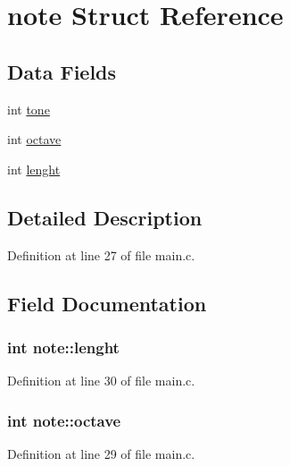 \hypertarget{structnote}{\section{note Struct Reference}
\label{structnote}
}
\subsection*{Data Fields}
\begin{DoxyCompactItemize}
\item 
int \hyperlink{structnote_a30832d96c968d682e5838b39370a1908}{tone}
\item 
int \hyperlink{structnote_a8b58f133e02c3ea4ec40ee641b654dcf}{octave}
\item 
int \hyperlink{structnote_a361dd34c08a22e0d8af45bfb8fefb287}{lenght}
\end{DoxyCompactItemize}


\subsection{Detailed Description}


Definition at line 27 of file main.\+c.



\subsection{Field Documentation}
\hypertarget{structnote_a361dd34c08a22e0d8af45bfb8fefb287}{
\subsubsection[{lenght}]{\setlength{\rightskip}{0pt plus 5cm}int note\+::lenght}}\label{structnote_a361dd34c08a22e0d8af45bfb8fefb287}


Definition at line 30 of file main.\+c.

\hypertarget{structnote_a8b58f133e02c3ea4ec40ee641b654dcf}{
\subsubsection[{octave}]{\setlength{\rightskip}{0pt plus 5cm}int note\+::octave}}\label{structnote_a8b58f133e02c3ea4ec40ee641b654dcf}


Definition at line 29 of file main.\+c.

